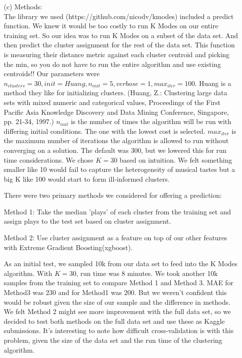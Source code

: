 \documentclass[12pt]{article}
\newcommand\tab[1][0.5cm]{\hspace*{#1}}
\begin{document}
\begin{enumerate}
\item[(c)]
Methods: \\
\tab The library we used (https://github.com/nicodv/kmodes) included a predict function. We knew it would be too costly to run K Modes on our entire training set. So our idea was to run K Modes on a subset of the data set. And then predict the cluster assignment for the rest of the data set. This function is measuring their distance metric against each cluster centroid and picking the min, so you do not have to run the entire algorithm and use existing centroids!!  Our parameters were $n_{clusters}=30, init=Huang, n_{init}=5, verbose=1, max_{iter}=100$. Huang is a method they like for initializing clusters. (Huang, Z.: Clustering large data sets with mixed numeric and categorical values, Proceedings of the First Pacific Asia Knowledge Discovery and Data Mining Conference, Singapore, pp. 21-34, 1997.) $n_{init}$ is the number of times the algorithm will be run with differing initial conditions. The one with the lowest cost is selected. $max_{iter}$ is the maximum number of iterations the algorithm is allowed to run without converging on a solution. The default was 300, but we lowered this for run time considerations. We chose $K=30$ based on intuition. We felt something smaller like 10 would fail to capture the heterogeneity of musical tastes but a big K like 100 would start to form ill-informed clusters.  

\tab There were two primary methods we considered for offering a prediction:

\tab Method 1:
Take the median 'plays' of each cluster from the training set and assign plays to the test set based on cluster assignment.

\tab Method 2:
Use cluster assignment as a feature on top of our other features with Extreme Gradient Boosting(xgboost).  

\tab As an initial test, we sampled 10k from our data set to feed into the K Modes algorithm. With $K=30$, run time was 8 minutes. We took another 10k samples from the training set to compare Method 1 and Method 3. MAE for Method3 was 230 and for Method1 was 200.  But we weren't confident this would be robust given the size of our sample and the difference in methods. We felt Method 2 might see more improvement with the full data set, so we decided to test both methods on the full data set and use these as Kaggle submissions. It's interesting to note how difficult cross-validation is with this problem, given the size of the data set and the run time of the clustering algorithm.



\end{enumerate}
\end{document}
